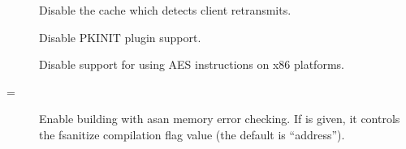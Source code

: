 \documentclass[letterpaper,10pt,english]{sphinxmanual}
\begin{document}
\begin{description}
\item[{\sphinxstylestrong{\sphinxhyphen{}}}] \leavevmode
\sphinxAtStartPar
Disable the cache which detects client retransmits.

\item[{\sphinxstylestrong{\sphinxhyphen{}}}] \leavevmode
\sphinxAtStartPar
Disable PKINIT plugin support.

\item[{\sphinxstylestrong{\sphinxhyphen{}}}] \leavevmode
\sphinxAtStartPar
Disable support for using AES instructions on x86 platforms.

\item[{\sphinxstylestrong{\sphinxhyphen{}}\sphinxstylestrong{\sphinxhyphen{}enable\sphinxhyphen{}asan}{[}=\sphinxstyleemphasis{ARG}{]}}] \leavevmode
\sphinxAtStartPar
Enable building with asan memory error checking.  If  is
given, it controls the \sphinxhyphen{}fsanitize compilation flag value (the
default is “address”).

\end{description}
\end{document}
